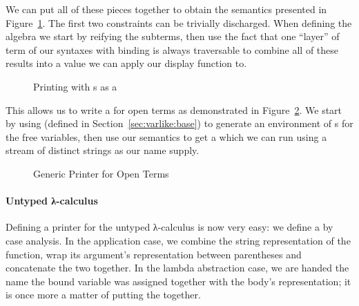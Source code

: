 \begin{agdasnippet}
\end{agdasnippet}

We can put all of these pieces together to obtain the  semantics
presented in Figure~\ref{fig:genericprinting}.
The first two constraints can be trivially discharged. When defining the
algebra we start by reifying the subterms, then use the fact that  one ``layer''
of term of our syntaxes with binding is always traversable to combine all of
these results into a value we can apply our display function to.

\begin{figure}[h]
\caption{Printing with s as a }\label{fig:genericprinting}
\end{figure}

This allows us to write a  for open terms as demonstrated in
Figure~\ref{fig:genericprint}.
We start by using  (defined in Section~\ref{sec:varlike:base})
to generate an environment of s for the free variables, then use
our semantics to get a  which we can run using a stream  of distinct
strings as our name supply.

\begin{figure}[h]
\caption{Generic Printer for Open Terms}\label{fig:genericprint}
\end{figure}


\paragraph{Untyped λ-calculus} Defining a printer for the untyped
λ-calculus is now very easy: we define a  by case analysis.
In the application case, we combine the string representation of the
function, wrap its argument's representation between parentheses and
concatenate the two together. In the lambda abstraction case, we are
handed the name the bound variable was assigned together with the body's
representation; it is once more a matter of putting the 
together.

\begin{agdasnippet}
\end{agdasnippet}

